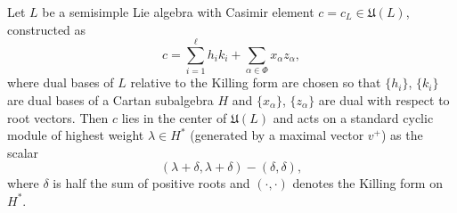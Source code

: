 Let $L$ be a semisimple Lie algebra with Casimir element $c = c_L \in \mathfrak{U}(L)$, constructed as
$$
c = \sum_{i=1}^{\ell} h_i k_i + \sum_{\alpha \in \Phi} x_\alpha z_\alpha,
$$
where dual bases of $L$ relative to the Killing form are chosen so that $\{h_i\}$, $\{k_i\}$ are dual bases of a Cartan subalgebra $H$ and $\{x_\alpha\}$, $\{z_\alpha\}$ are dual with respect to root vectors. Then $c$ lies in the center of $\mathfrak{U}(L)$ and acts on a standard cyclic module of highest weight $\lambda \in H^*$ (generated by a maximal vector $v^+$) as the scalar
$$
(\lambda + \delta, \lambda + \delta) - (\delta, \delta),
$$
where $\delta$ is half the sum of positive roots and $(\cdot, \cdot)$ denotes the Killing form on $H^*$.
